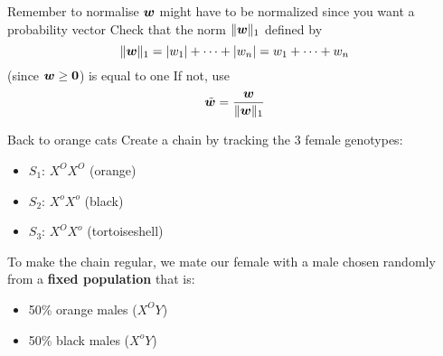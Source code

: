 \documentclass[aspectratio=169]{beamer}\usepackage[]{graphicx}\usepackage[]{xcolor}
\begin{document}
\begin{frame}{Remember to normalise}
$\bm{w}$ might have to be normalized since you want a probability vector
\vfill
Check that the norm $\|\bm{w}\|_1$ defined by
\[
\|\bm{w}\|_1=|w_1|+\cdots+|w_n|=w_1+\cdots+w_n
\]
(since $\bw\geq\b0$) is equal to one
\vfill
If not, use
\[
\tilde{\bm{w}} = \frac{\bm{w}}{\|\bm{w}\|_1}
\]
\end{frame}

\begin{frame}{Back to orange cats}
     Create a chain by tracking the 3 female genotypes:
    \begin{itemize}
        \item $S_1$: $X^O X^O$ (orange)
        \item $S_2$: $X^o X^o$ (black)
        \item $S_3$: $X^O X^o$ (tortoiseshell)
    \end{itemize}
    \vfill
    To make the chain regular, we mate our female with a male chosen randomly from a \textbf{fixed population} that is:
    \begin{itemize}
        \item 50\% orange males ($X^O Y$)
        \item 50\% black males ($X^o Y$)
    \end{itemize}
\end{frame}
\end{document}
